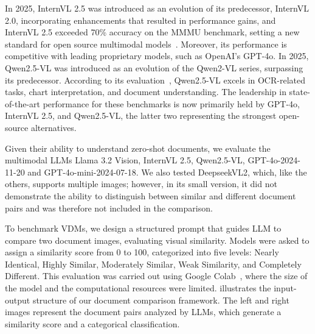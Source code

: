 In 2025, InternVL 2.5 was introduced as an evolution of its predecessor, InternVL 2.0, incorporating enhancements that resulted in performance gains, and InternVL 2.5 exceeded 70\% accuracy on the MMMU benchmark, setting a new standard for open source multimodal models~\cite{internvl2024}. Moreover, its performance is competitive with leading proprietary models, such as OpenAI’s GPT-4o\cite{openai2024gpt4o,openai2024gpt4omini}.
In 2025, Qwen2.5-VL was introduced as an evolution of the Qwen2-VL series, surpassing its predecessor. According to its evaluation~\cite{bai2025qwen2}, Qwen2.5-VL excels in OCR-related tasks, chart interpretation, and document understanding. The leadership in state-of-the-art performance for these benchmarks is now primarily held by GPT-4o, InternVL 2.5, and Qwen2.5-VL, the latter two representing the strongest open-source alternatives.

Given their ability to understand zero-shot documents, we evaluate the multimodal \glspl{LLM} Llama 3.2 Vision, InternVL 2.5, Qwen2.5-VL, GPT-4o-2024-11-20 and GPT-4o-mini-2024-07-18. We also tested DeepseekVL2, which, like the others, supports multiple images; however, in its small version, it did not demonstrate the ability to distinguish between similar and different document pairs and was therefore not included in the comparison.

To benchmark \glspl{VDM}, we design a structured prompt that guides \gls{LLM} to compare two document images, evaluating visual similarity. Models were asked to assign a similarity score from 0 to 100, categorized into five levels: Nearly Identical, Highly Similar, Moderately Similar, Weak Similarity, and Completely Different. This evaluation was carried out using Google Colab~\cite{googlecolab}, where the size of the model and the computational resources were limited.  illustrates the input-output structure of our document comparison framework. The left and right images represent the document pairs analyzed by \glspl{LLM}, which generate a similarity score and a categorical classification.

